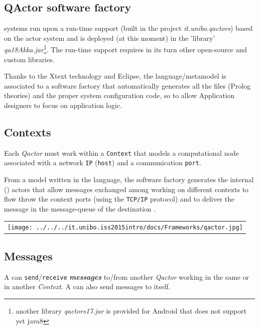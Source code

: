 \subsection{QActor software factory} 

\qa{} systems run upon a run-time support  (built in the project \textit{it.unibo.qactors}) based on the \akka{} actor system and is deployed (at this moment) in the 'library' \textit{qa18Akka.jar}\footnote{another library \textit{qactors17.jar} is provided for Android that does not support yet java8}. The \qa{} run-time support requires in its turn other open-source and custom libraries. 

Thanks to the Xtext technology and Eclipse, the \qa{} language/metamodel is associated to a software factory that automatically generates all the files (Prolog theories) and the proper system configuration code, so to allow Application designers to focus on application logic.
 

\subsection{Contexts } 
Each \textit{Qactor} must work within a  \texttt{Context} that models a computational node associated with a network \texttt{IP} (\texttt{host}) and a communication \texttt{port}. 

From a model written in the \qa{} language, the \qa{} software factory generates the internal (\akka) actors that allow 
messages exchanged among \qa{} working on different contexts to flow throw the context ports (using the \texttt{TCP/IP} protocol) and to deliver the message in the message-queue of the destination \qa{}.
 
\begin{center}
\begin{tabular}{ c }
     \texttt{[image: ../../../it.unibo.iss2015intro/docs/Frameworks/qactor.jpg]}\\
\end{tabular}{   }
\end{center}

\subsection{Messages} 
A \qa{} can \texttt{send}/\texttt{receive} \textit{\textbf{messages}} to/from another \textit{Qactor} working in the same or in another \textit{Context}. A \qa{} can also send messages to itself.


